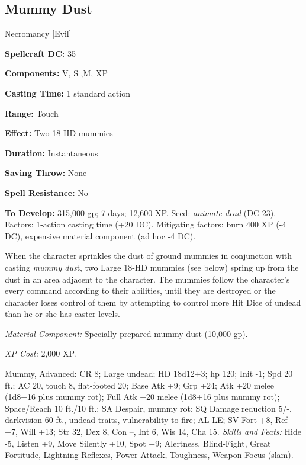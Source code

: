\documentclass{article}
\begin{document}
\vspace{12pt}
\subsection*{Mummy Dust }

Necromancy [Evil] 

\textbf{Spellcraft DC:} 35 

\textbf{Components:} V, S ,M, XP 

\textbf{Casting Time:} 1 standard action 

\textbf{Range:} Touch 

\textbf{Effect:} Two 18-HD mummies 

\textbf{Duration:} Instantaneous 

\textbf{Saving Throw:} None 

\textbf{Spell Resistance:} No 

\textbf{To Develop:} 315,000 gp; 7 days; 12,600 XP. Seed: \textit{animate dead 
}(DC 23). Factors: 1-action casting time (+20 DC). Mitigating factors: burn 400 
XP (-4 DC), expensive material component (ad hoc -4 DC). 

When the character sprinkles the dust of ground mummies in conjunction with casting 
\textit{mummy dus}t, two Large 18-HD mummies (see below) spring up from the dust 
in an area adjacent to the character. The mummies follow the character's every 
command according to their abilities, until they are destroyed or the character 
loses control of them by attempting to control more Hit Dice of undead than he 
or she has caster levels. 

\textit{Material Component: }Specially prepared mummy dust (10,000 gp). 

\textit{XP Cost: }2,000 XP. 

Mummy, Advanced: CR 8; Large undead; HD 18d12+3; hp 120; Init -1; Spd 20 ft.; AC 
20, touch 8, flat-footed 20; Base Atk +9; Grp +24; Atk +20 melee (1d8+16 plus mummy 
rot); Full Atk +20 melee (1d8+16 plus mummy rot); Space/Reach 10 ft./10 ft.; SA 
Despair, mummy rot; SQ Damage reduction 5/-, darkvision 60 ft., undead traits, 
vulnerability to fire; AL LE; SV Fort +8, Ref +7, Will +13; Str 32, Dex 8, Con 
--, Int 6, Wis 14, Cha 15. \textit{Skills and Feats:} Hide -5, Listen +9, Move 
Silently +10, Spot +9; Alertness, Blind-Fight, Great Fortitude, Lightning Reflexes, 
Power Attack, Toughness, Weapon Focus (slam).
\end{document}
